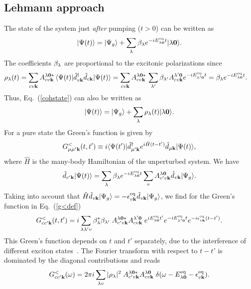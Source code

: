 \documentclass[twocolumn,aps,a4paper,superscriptaddress]{revtex4-2}
\begin{document}
\begin{widetext}
\section{Lehmann approach}
\label{lehmannapp}
The state of the system just {\em after} pumping ($t>0$)
can be written as
\begin{align}
|\Psi(t)\rangle=|\Psi_{g}\rangle+\sum_{\lambda}\beta_{\lambda}e^{-iE^{\rm eq}_{\lambda\mathbf 0}t}|\lambda\mathbf 0\rangle.
\label{cohstate}
\end{align}
The coefficients $\beta_{\lambda}$ are proportional to the excitonic
polarizations since
\begin{align}
\rho_{\lambda}(t)&=
\sum_{cv{\mathbf k}}A^{\lambda\mathbf 0\ast}_{cv{\mathbf k}}\,
\langle\Psi(t)|\hat{d}^{\dag}_{v{\mathbf k}}\hat{d}_{c{\mathbf k}}|\Psi(t)\rangle
=\sum_{cv{\mathbf k}}A^{\lambda\mathbf 0\ast}_{cv{\mathbf k}}\,
\sum_{\lambda'}\beta_{\lambda'}A^{\lambda'\mathbf 0}_{cv{\mathbf k}}e^{-iE^{\rm eq}_{\lambda'\mathbf 0}t}
=\beta_{\lambda}e^{-iE^{\rm eq}_{\lambda\mathbf 0}t}.
\label{rldef}
\end{align}
Thus, Eq.~(\ref{cohstate}) can also be written as
\begin{align}
|\Psi(t)\rangle=|\Psi_{g}\rangle+\sum_{\lambda}\rho_{\lambda}(t)|\lambda\mathbf 0\rangle.
\label{cohstate2}
\end{align}
For a pure state the Green's function is given by
\begin{align}
G^{<}_{\mu\mu'{\mathbf k}}(t,t')\equiv i\langle\Psi(t')|\hat{d}^{\dag}_{\mu'{\mathbf k}}e^{i\hat{H}(t-t')}
\hat{d}_{\mu{\mathbf k}}|\Psi(t)\rangle,
\label{g<def}
\end{align}
where $\hat{H}$ is the many-body Hamiltonian of the unperturbed system.
We have
\begin{align}
\hat{d}_{c'{\mathbf k}}|\Psi(t)\rangle=
\sum_{\lambda}\beta_{\lambda} e^{-iE^{\rm eq}_{\lambda\mathbf 0}t}\sum_{v}
A^{\lambda\mathbf 0}_{c'v{\mathbf k}}\hat{d}_{v{\mathbf k}}|\Psi_{g}\rangle.
\end{align}
Taking into account that $\hat{H}\hat{d}_{v{\mathbf k}}|\Psi_{g}\rangle
=-\epsilon^{\rm eq}_{v{\mathbf k}}\hat{d}_{v{\mathbf k}}|\Psi_{g}\rangle$,
we find for the Green's function in Eq.~(\ref{g<def})
\begin{align}
G^{<}_{cc'{\mathbf k}}(t,t')=i\sum_{\lambda\lambda'v}\beta_{\lambda}^{\ast}\beta_{\lambda'}\;
A^{\lambda\mathbf 0\ast}_{c'v{\mathbf k}}A^{\lambda'\mathbf 0}_{cv{\mathbf k}}\;
e^{iE^{\rm eq}_{\lambda\mathbf 0}t'}e^{-iE^{\rm eq}_{\lambda'\mathbf 0}t}
e^{-i\epsilon^{\rm eq}_{v{\mathbf k}}(t-t')}.
\label{gfcohleh}
\end{align}
This Green's function depends on $t$ and $t'$ separately, due to the
interference of different exciton
states~\cite{rustagi_coherent_2019,zhang_long-lived_2025}. The Fourier
transform with respect to $t-t'$ is dominated by the diagonal
contributions and reads
\begin{align}
G^{<}_{cc'{\mathbf k}}(\omega)=2\pi i\sum_{\lambda v}|\rho_{\lambda}|^{2}\;
A^{\lambda\mathbf 0\ast}_{c'v{\mathbf k}}A^{\lambda\mathbf 0}_{cv{\mathbf k}}\;
\delta(\omega-E^{\rm eq}_{\lambda\mathbf 0}-\epsilon^{\rm eq}_{v{\mathbf k}}).
\label{gfcohlehw}
\end{align}


\end{widetext}
\end{document}
